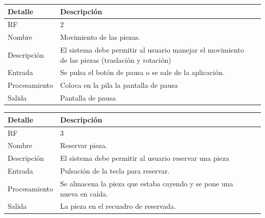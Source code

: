 \documentclass{article}
\begin{document}
\begin{table}[H]
  \begin{center}
    \begin{tabularx}{\linewidth}{|X|X|X|} %
      \hline
      \textbf{Detalle} & \textbf{Descripción}\\
      \hline
      RF & 2 \\
      \hline
      Nombre & Movimiento de las piezas.\\
      \hline
      Descripción & El sistema debe permitir al usuario manejar el movimiento de las piezas (traslación y rotación)\\
      \hline
      Entrada & Se pulsa el botón de pausa o se sale de la aplicación.\\
      \hline
      Procesamiento & Coloca en la pila la pantalla de pausa\\
      \hline
      Salida & Pantalla de pausa\\
      \hline
    \end{tabularx}
  \end{center}
\end{table}

\begin{table}[H]
  \begin{center}
    \begin{tabularx}{\linewidth}{|X|X|X|} %
      \hline
      \textbf{Detalle} & \textbf{Descripción}\\
      \hline
      RF & 3 \\
      \hline
      Nombre & Reservar pieza.\\
      \hline
      Descripción & El sistema debe permitir al usuario reservar una pieza\\
      \hline
      Entrada & Pulsación de la tecla para reservar.\\
      \hline
      Procesamiento & Se almacena la pieza que estaba cayendo y se pone una nueva en caída.\\
      \hline
      Salida & La pieza en el recuadro de reservada.\\
      \hline
    \end{tabularx}
  \end{center}
\end{table}
\end{document}
